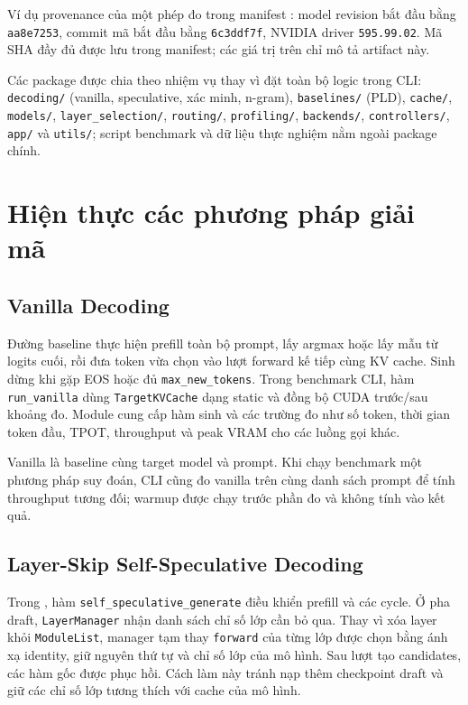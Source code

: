 Ví dụ provenance của một phép đo trong manifest : model revision bắt đầu bằng \texttt{aa8e7253}, commit mã bắt đầu bằng \texttt{6c3ddf7f}, NVIDIA driver \texttt{595.99.02}. Mã SHA đầy đủ được lưu trong manifest; các giá trị trên chỉ mô tả artifact này.

Các package được chia theo nhiệm vụ thay vì đặt toàn bộ logic trong CLI: \texttt{decoding/} (vanilla, speculative, xác minh, n-gram), \texttt{baselines/} (PLD), \texttt{cache/}, \texttt{models/}, \texttt{layer\_selection/}, \texttt{routing/}, \texttt{profiling/}, \texttt{backends/}, \texttt{controllers/}, \texttt{app/} và \texttt{utils/}; script benchmark và dữ liệu thực nghiệm nằm ngoài package chính.

\section{Hiện thực các phương pháp giải mã}

\subsection{Vanilla Decoding}
Đường baseline thực hiện prefill toàn bộ prompt, lấy argmax hoặc lấy mẫu từ logits cuối, rồi đưa token vừa chọn vào lượt forward kế tiếp cùng KV cache. Sinh dừng khi gặp EOS hoặc đủ \texttt{max\_new\_tokens}. Trong benchmark CLI, hàm \texttt{run\_vanilla} dùng \texttt{TargetKVCache} dạng static và đồng bộ CUDA trước/sau khoảng đo. Module  cung cấp hàm sinh và các trường đo như số token, thời gian token đầu, TPOT, throughput và peak VRAM cho các luồng gọi khác.

Vanilla là baseline cùng target model và prompt. Khi chạy benchmark một phương pháp suy đoán, CLI cũng đo vanilla trên cùng danh sách prompt để tính throughput tương đối; warmup được chạy trước phần đo và không tính vào kết quả.

\subsection{Layer-Skip Self-Speculative Decoding}
Trong , hàm \texttt{self\_speculative\_generate} điều khiển prefill và các cycle. Ở pha draft, \texttt{LayerManager} nhận danh sách chỉ số lớp cần bỏ qua. Thay vì xóa layer khỏi \texttt{ModuleList}, manager tạm thay \texttt{forward} của từng lớp được chọn bằng ánh xạ identity, giữ nguyên thứ tự và chỉ số lớp của mô hình. Sau lượt tạo candidates, các hàm gốc được phục hồi. Cách làm này tránh nạp thêm checkpoint draft và giữ các chỉ số lớp tương thích với cache của mô hình.

